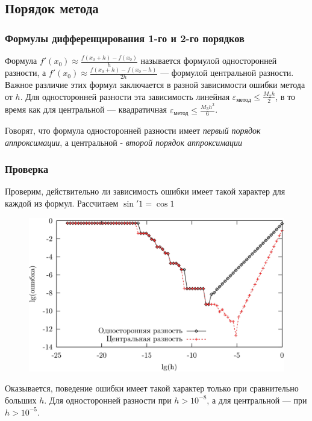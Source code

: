 \documentclass[aspectratio=169,unicode]{beamer}
\begin{document}
\subsection{Порядок метода}
\begin{frame}
\frametitle{Формулы дифференцирования 1-го и 2-го порядков}
	Формула $f'(x_0) \approx \frac{f(x_0+h) - f(x_0)}{h}$ называется формулой односторонней разности, а
	$f'(x_0) \approx \frac{f(x_0 + h) - f(x_0 - h)}{2h}$ --- формулой центральной разности. Важное различие этих формул заключается
	в разной зависимости ошибки метода от $h$. Для односторонней разности эта зависимость линейная
	$\varepsilon_{\text{метод}} \leqslant \frac{M_2 h}{2}$, в то время как для центральной --- квадратичная
	$\varepsilon_{\text{метод}} \leqslant \frac{M_3 h^2}{6}$.
	\pause

	Говорят, что формула односторонней разности имеет \emph{первый порядок аппроксимации},
	а центральной - \emph{второй порядок аппроксимации}
\end{frame}

\begin{frame}
\frametitle{Проверка}
	Проверим, действительно ли зависимость ошибки имеет такой характер для каждой из формул. Рассчитаем $\sin'1 = \cos 1$

	\begin{figure}%
	\centering
	\includegraphics[height=0.5\textheight]{diff.png}%
	\end{figure}

	Оказывается, поведение ошибки имеет такой характер только при сравнительно больших $h$. Для односторонней разности при $h > 10^{-8}$,
	а для центральной --- при $h > 10^{-5}$.
\end{frame}
\end{document}
